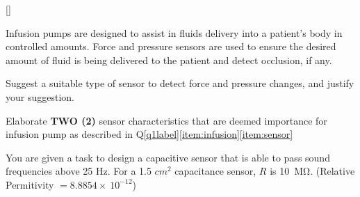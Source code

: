 %
{}

\bigskip 

\question{}[\label{q1label}]

\listbeginx	%
	\item \label{item:infusion} Infusion pumps are designed to assist in fluids delivery into a patient's body in controlled amounts. Force and pressure sensors are used to ensure the desired amount of fluid is being delivered to the patient and detect occlusion, if any.
	
	
	\listbegin
		\item \label{item:sensor} Suggest a suitable type of sensor to detect force and pressure changes, and justify your suggestion.
		
		
		
		\item Elaborate \textbf{TWO (2)} sensor characteristics that are deemed importance for infusion pump as described in Q\ref{q1label}\ref{item:infusion}\ref{item:sensor}
		
		

	\listclose %
	
	\item You are given a task to design a capacitive sensor that is able to pass sound frequencies above 25 Hz. For a 1.5 $cm^2$ capacitance sensor, $R$ is 10~\si{\mega\ohm}. (Relative Permitivity $= 8.8854 \times~10^{-12}$)
	
	
